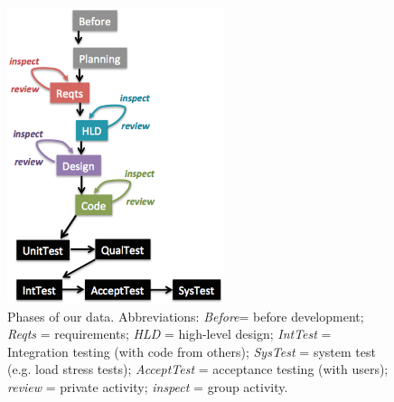 \begin{figure}[!b]  
\begin{center}
\includegraphics[width=2.5in]{img/waterfall-v3.png}  
\end{center}
\caption{Phases of our data.
Abbreviations: \newline
{\em Before}= before development;\newline
{\em Reqts}	  = requirements;\newline
{\em HLD}	  = high-level design;\newline
{\em IntTest} = Integration testing (with code from others);\newline
{\em SysTest} = system test (e.g. load stress tests);\newline
{\em AcceptTest}  = acceptance testing (with users);\newline
{\em review}        = private activity;\newline
{\em inspect}        = group activity.}
\label{fig:waterfall}
\end{figure}

